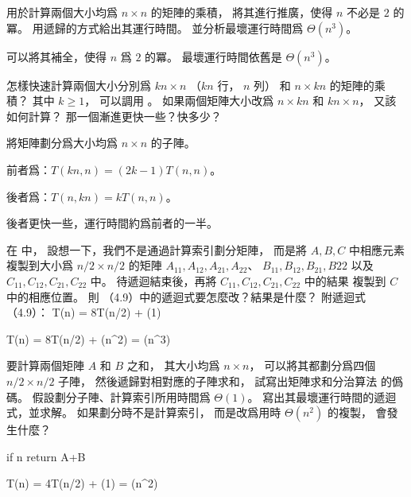 \startsection[
  title={Multiplying square matrices},
]

\startEXERCISE
{} 用於計算兩個大小均爲 $n\times n$ 的矩陣的乘積，
將其進行推廣，使得 $n$ 不必是 $2$ 的冪。
用遞歸的方式給出其運行時間。
並分析最壞運行時間爲 $\Theta(n^3)$。
\stopEXERCISE

\startANSWER
可以將其補全，使得 $n$ 爲 $2$ 的冪。
最壞運行時間依舊是 $\Theta(n^3)$。
\stopANSWER

\startEXERCISE
怎樣快速計算兩個大小分別爲 $k n\times n$ （$kn$ 行， $n$ 列）
和 $n\times kn$ 的矩陣的乘積？
其中 $k\ge 1$，
可以調用 。
如果兩個矩陣大小改爲 $n\times kn$ 和 $kn\times n$，
又該如何計算？
那一個漸進更快一些？快多少？
\stopEXERCISE

\startANSWER
將矩陣劃分爲大小均爲 $n\times n$ 的子陣。

前者爲：$T(kn,n) = (2k-1)T(n,n)$。

後者爲：$T(n,kn) = k T(n,n)$。

後者更快一些，運行時間約爲前者的一半。
\stopANSWER

\startEXERCISE
在  中，
設想一下，我們不是通過計算索引劃分矩陣，
而是將 $A,B,C$ 中相應元素複製到大小爲 $n/2\times n/2$ 的矩陣
$A_{11},A_{12},A_{21},A_{22}$、 $B_{11},B_{12},B_{21},B{22}$
以及 $C_{11},C_{12},C_{21},C_{22}$ 中。
待遞迴結束後，再將 $C_{11},C_{12},C_{21},C_{22}$ 中的結果
複製到 $C$ 中的相應位置。
則 （4.9）中的遞迴式要怎麼改？結果是什麼？
附遞迴式（4.9）：
\startformula
T(n) = 8T(n/2) + \Theta(1)
\stopformula
\stopEXERCISE

\startANSWER
\startsplitformula\startmathalignment
\NC T(n) \NC = 8T(n/2) + \Theta(n^2) \NR
\NC \NC = \Theta(n^3) \NR
\stopmathalignment\stopsplitformula
\stopANSWER

\startEXERCISE
要計算兩個矩陣 $A$ 和 $B$ 之和，
其大小均爲 $n\times n$，
可以將其都劃分爲四個 $n/2\times n/2$ 子陣，
然後遞歸對相對應的子陣求和，
試寫出矩陣求和分治算法  的僞碼。
假設劃分子陣、計算索引所用時間爲 $\Theta(1)$。
寫出其最壞運行時間的遞迴式，並求解。
如果劃分時不是計算索引，
而是改爲用時 $\Theta(n^2)$ 的複製，
會發生什麼？
\stopEXERCISE

\startANSWER
{}
\startCLRSCODE
if n 
	return A+B
\stopCLRSCODE

\startsplitformula\startmathalignment
\NC T(n) \NC = 4T(n/2) + \Theta(1) \NR
\NC \NC = \Theta(n^2) \NR
\stopmathalignment\stopsplitformula
\stopANSWER

\stopsection
